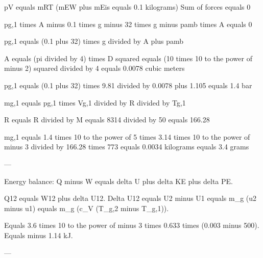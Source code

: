 pV equals mRT  
(mEW plus mEis equals 0.1 kilograms)  
Sum of forces equals 0  

pg,1 times A minus 0.1 times g minus 32 times g minus pamb times A equals 0  

pg,1 equals (0.1 plus 32) times g divided by A plus pamb  

A equals (pi divided by 4) times D squared equals (10 times 10 to the power of minus 2) squared divided by 4 equals 0.0078 cubic meters  

pg,1 equals (0.1 plus 32) times 9.81 divided by 0.0078 plus 1.105 equals 1.4 bar  

mg,1 equals pg,1 times Vg,1 divided by R divided by Tg,1  

R equals R divided by M equals 8314 divided by 50 equals 166.28  

mg,1 equals 1.4 times 10 to the power of 5 times 3.14 times 10 to the power of minus 3 divided by 166.28 times 773 equals 0.0034 kilograms equals 3.4 grams  

---

Energy balance:  
Q minus W equals delta U plus delta KE plus delta PE.  

Q12 equals W12 plus delta U12.  
Delta U12 equals U2 minus U1 equals m_g (u2 minus u1) equals m_g (c_V (T_g,2 minus T_g,1)).  

Equals 3.6 times 10 to the power of minus 3 times 0.633 times (0.003 minus 500).  
Equals minus 1.14 kJ.  

---